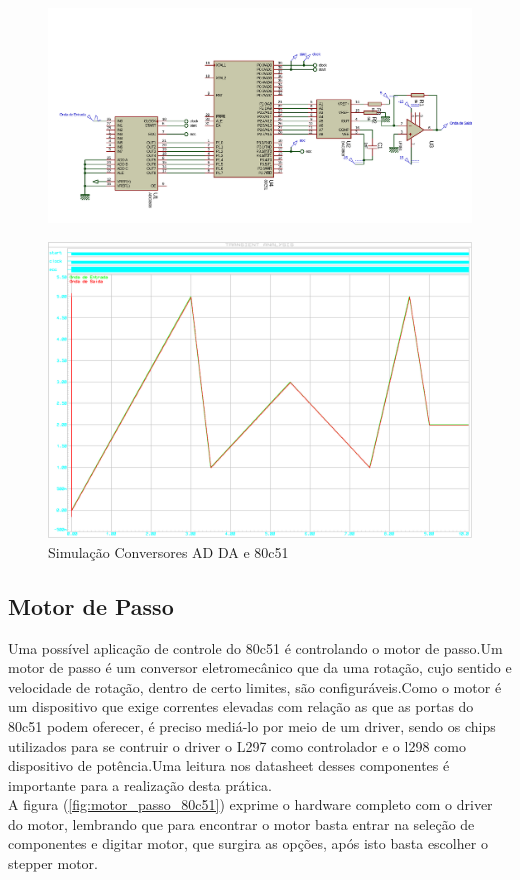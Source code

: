 \documentclass{Fabiano_file}
\begin{document}
{	%
	\begin{figure}
		\centering
		\includegraphics[width=1\linewidth]{adc_dac_completa}
		\label{fig:adc_dac_completa}
	\end{figure}
	
\begin{figure}[h!]
\centering
\includegraphics[width=1\textwidth]{adc_8051_dac.pdf}
\caption{Simulação Conversores AD DA e 80c51}
\label{fig:adc_8051_dac}
\end{figure}

\newpage

\subsection{Motor de Passo}
Uma possível aplicação de controle do 80c51 é controlando o motor de passo.Um motor de passo é um conversor eletromecânico que da uma rotação, cujo sentido e 
velocidade de rotação, dentro de certo limites, são configuráveis.Como o motor é um dispositivo que exige correntes elevadas com relação as que as portas 
do 80c51 podem oferecer, é preciso mediá-lo por meio de um driver, sendo os chips utilizados para se contruir o driver o L297 como controlador e o l298 
como dispositivo de potência.Uma leitura nos datasheet desses componentes é importante para a realização desta prática.\\
A figura (\ref{fig:motor_passo_80c51}) exprime o hardware completo com o driver do motor, lembrando que para encontrar o motor basta entrar na seleção de 
componentes e digitar motor, que surgira as opções, após isto basta escolher o stepper motor.

}
\end{document}
